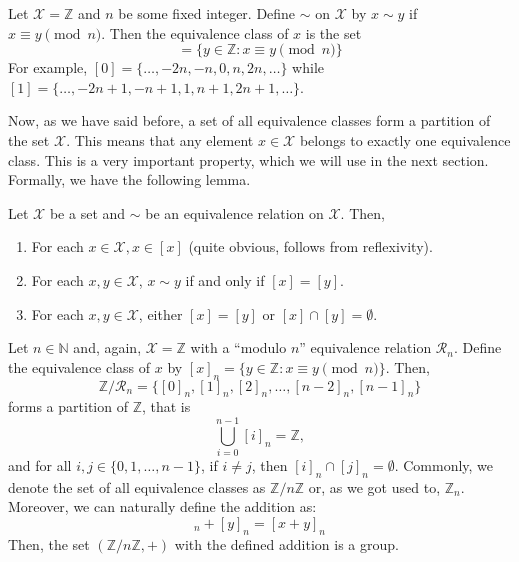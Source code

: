\documentclass[../lecture-notes.tex]{subfiles}
\begin{document}
\begin{example}
    Let $\mathcal{X} = \mathbb{Z}$ and $n$ be some fixed integer. Define $\sim$ on $\mathcal{X}$ by $x \sim y$ if $x \equiv y \pmod{n}$. Then the equivalence class of $x$ is the set
    \begin{equation}
        [x] = \{y \in \mathbb{Z}: x \equiv y \pmod{n}\}
    \end{equation}
    For example, $[0] = \{\ldots,-2n,-n,0,n,2n,\ldots\}$ while $[1] = \{\ldots,-2n+1,-n+1,1,n+1,2n+1,\ldots\}$.
\end{example}

Now, as we have said before, a set of all equivalence classes form a partition of the set $\mathcal{X}$. This means that any element $x \in \mathcal{X}$ belongs to exactly one equivalence class. This is a very important property, which we will use in the next section. Formally, we have the following lemma.
\begin{lemma}
    Let $\mathcal{X}$ be a set and $\sim$ be an equivalence relation on $\mathcal{X}$. Then,
    \begin{enumerate}
        \item For each $x \in \mathcal{X}, x \in [x]$ (quite obvious, follows from reflexivity).
        \item For each $x,y \in \mathcal{X}$, $x \sim y$ if and only if $[x] = [y]$.
        \item For each $x,y \in \mathcal{X}$, either $[x]=[y]$ or $[x] \cap [y] = \emptyset$.
    \end{enumerate}
\end{lemma}

\begin{example}
    Let $n \in \mathbb{N}$ and, again, $\mathcal{X} = \mathbb{Z}$ with a ``modulo $n$'' equivalence relation $\mathcal{R}_n$. Define the equivalence class of $x$ by $[x]_n = \{y \in \mathbb{Z}: x \equiv y \pmod{n}\}$. Then, 
    \begin{equation}
        \mathbb{Z}/\mathcal{R}_n = \{[0]_n, [1]_n, [2]_n, \dots, [n-2]_n, [n-1]_n\}
    \end{equation}
    forms a partition of $\mathbb{Z}$, that is 
    \begin{equation}
        \bigcup_{i=0}^{n-1} [i]_n = \mathbb{Z},
    \end{equation}
    and for all $i,j \in \{0,1,\dots,n-1\}$, if $i \neq j$, then $[i]_n \cap [j]_n = \emptyset$. Commonly, we denote the set of all equivalence classes as $\mathbb{Z}/n\mathbb{Z}$ or, as we got used to, $\mathbb{Z}_n$. Moreover, we can naturally define the addition as:
    \begin{equation}
        [x]_n + [y]_n = [x+y]_n
    \end{equation}
    Then, the set $(\mathbb{Z}/n\mathbb{Z},+)$ with the defined addition is a group.
\end{example}
\end{document}
